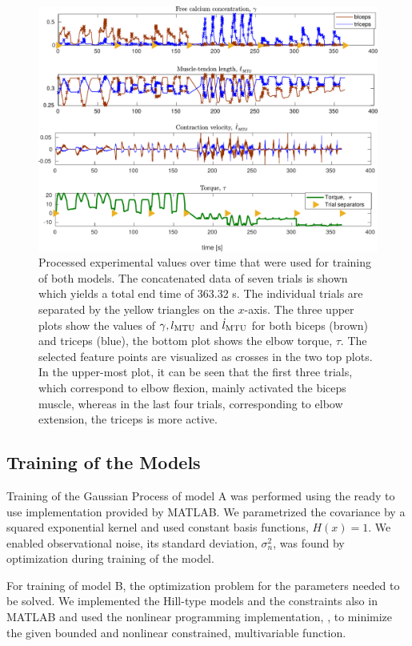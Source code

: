 \begin{figure}%
  \centering%
  \includegraphics[width=\textwidth]{images/summer_school_study/selected_points.pdf}%
  \caption{Processed experimental values over time that were used for training of both models. The concatenated data of seven trials is shown which yields a total end time of 363.32 s. The individual trials are separated by the yellow triangles on the $x$-axis. The three upper plots show the values of $\gamma, l_{\text{MTU}}$ and $\dot{l}_{\text{MTU}}$ for both biceps (brown) and triceps (blue), the bottom plot shows the elbow torque, $\tau$. The selected feature points are visualized as crosses in the two top plots. In the upper-most plot, it can be seen that the first three trials, which correspond to elbow flexion, mainly activated the biceps muscle, whereas in the last four trials, corresponding to elbow extension, the triceps is more active.
}%
  \label{fig:selected_points}%
\end{figure}%

\subsection{Training of the Models}\label{sec:res_training}

Training of the Gaussian Process of model A was performed using the ready to use implementation provided by MATLAB.
We parametrized the covariance by a squared exponential kernel and used constant basis functions, $H(x) = 1$. We enabled observational noise, its standard deviation, $\sigma_n^2$, was found by optimization during training of the model.

For training of model B, the optimization problem for the parameters needed to be solved. We implemented the Hill-type models and the constraints also in MATLAB and used the nonlinear programming implementation, , to minimize the given bounded and nonlinear constrained, multivariable function.

